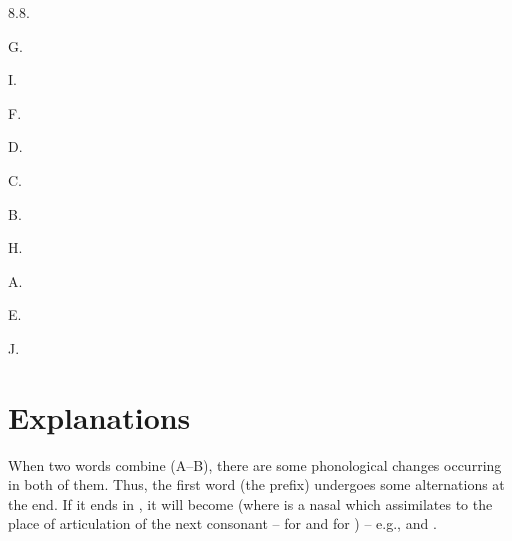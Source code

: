 \begin{refsection}
     \begin{practiceproblemsolution}{8.8. \langnameMalagasy}

     \begin{solutions}[label=Solution 8.8\alph*]
         \item
     \begin{enumerate}
     \begin{multicols}{5}
        \item G.
        \item I.
        \item F.
        \item D.
        \item C.
        \item B.
        \item H.
        \item A.
        \item E.
        \item J.
     \end{multicols}
     \end{enumerate}
     \item
     \begin{enumerate}[start = 11]
     \begin{multicols}{3}
        \item {}
        \item {}
        \item {}
     \end{multicols}
     \end{enumerate}
     \item
     \begin{enumerate}[start = 14]
     \begin{multicols}{3}
        \item {}
        \item {}
        \item {}
     \end{multicols}
     \end{enumerate}
     \end{solutions}
     \end{practiceproblemsolution}

\section*{Explanations}

When two words combine (A--B), there are some phonological changes occurring in both of them. Thus, the first word (the prefix) undergoes some alternations at the end. If it ends in , it will become  (where  is a nasal which assimilates to the place of articulation of the next consonant --  for  and  for ) -- e.g.,  and .


\end{refsection}
